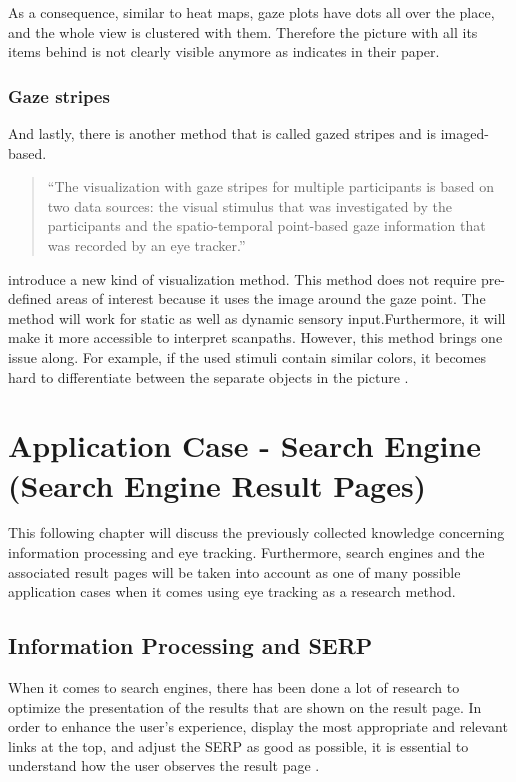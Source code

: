 As a consequence, similar to heat maps, gaze plots have dots all over the place, and the whole view is clustered with them. Therefore the picture with all its items behind is not clearly visible anymore as \textcite[]{djamasbi2014eye} indicates in their paper.

\subsubsection{Gaze stripes}
And lastly, there is another method that is called gazed stripes and is imaged-based.

\begin{quote}
``The visualization with gaze stripes for multiple participants is based on two data sources: the visual stimulus that was investigated by the participants and the spatio-temporal point-based gaze information that was recorded by an eye tracker.''
\autocite[3]{kurzhals2016gaze}
\end{quote}

\textcite[]{kurzhals2016gaze} introduce a new kind of visualization method. This method does not require pre-defined areas of interest because it uses the image around the gaze point. The method will work for static as well as dynamic sensory input.Furthermore, it will make it more accessible to interpret scanpaths. 
However, this method brings one issue along. For example, if the used stimuli contain similar colors, it becomes hard to differentiate between the separate objects in the picture \autocite[]{kurzhals2016gaze}.

\section{Application Case - Search Engine (Search Engine Result Pages)}
\label{section:SearchEngine}
This following chapter will discuss the previously collected knowledge concerning information processing and eye tracking. Furthermore, search engines and the associated result pages will be taken into account as one of many possible application cases when it comes using eye tracking as a research method.

\subsection{Information Processing and SERP}
\label{subsection:ReadingSERP}
When it comes to search engines, there has been done a lot of research to optimize the presentation of the results that are shown on the result page.  In order to enhance the user's experience, display the most appropriate and relevant links at the top, and adjust the SERP as good as possible, it is essential to understand how the user observes the result page \autocite{buscher2010good, liu2015influence}.

